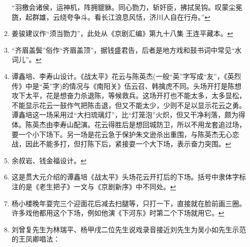 \begin{enumerate}
  ``羽檄会诸侯，运神机，阵拥貔貅。同心勠力，斩奸臣，拂拭吴钩。叹蒙尘冕旒，起群雄，云绕夸争斗。看长江浪息风恬，济川人自在行舟。''\protect\hyperlink{fnref546}{↩}
\item
  \leavevmode\hypertarget{fn547}{}%
  姜骏建议作``须当勠力''，此处从《京剧汇编》第九十八集
  王连平藏本。\protect\hyperlink{fnref547}{↩}
\item
  \leavevmode\hypertarget{fn548}{}%
  ``齐眉盖鬓''俗作``齐眉盖顶''，据钱盛君告，后者是地方戏和鼓书词中常见``水词儿''。\protect\hyperlink{fnref548}{↩}
\item
  \leavevmode\hypertarget{fn549}{}%
  谭鑫培、李寿山设计。《战太平》花云与陈英杰(一般``英''字写成``友''，《英烈传》中是``英''字)的情况与《南阳关》伍云召、韩擒虎不同。头场开打是陈想攻下太平，花是想奋力杀退陈，等候救兵。这场开打也不能太多，太多显松，不能显示花云一鼓作气把陈击退，但又不能太少，少则不足以显示花云之勇。谭鑫培这一场采用过``大扫琉璃灯''，比``灯笼泡''火炽，但又干净利落，颇为得体。陈英杰由李寿山配演。花云得胜后是想回城防卫，所以不用龙套追过场，要一个小下场下。另一场是花云急于保护朱文逊杀出重围，与陈英杰无心恋战，因此不能多打，但打陈下后，紧接耍一个大下场，表示奋力突围。\protect\hyperlink{fnref549}{↩}
\item
  \leavevmode\hypertarget{fn550}{}%
  余叔岩、钱金福设计。\protect\hyperlink{fnref550}{↩}
\item
  \leavevmode\hypertarget{fn551}{}%
  这是贯大元介绍的谭鑫培《战太平》头场花云开打后的下场。括号中隶体字标注的是《老生把子》一文与《京剧新序》中不同处。\protect\hyperlink{fnref551}{↩}
\item
  \leavevmode\hypertarget{fn552}{}%
  杨小楼晚年耍完三个迎面花后减去扫腿等，只打一下，直接就在脸前画三圈。许多戏他都用这个下场，例如他演《下河东》时第二个下场就用它。\protect\hyperlink{fnref552}{↩}
\item
  \leavevmode\hypertarget{fn553}{}%
  刘曾复先生为林瑞平、杨甲戌二位先生说戏录音接近刘先生为吴小如先生示范的王凤卿唱法：


\end{enumerate}
